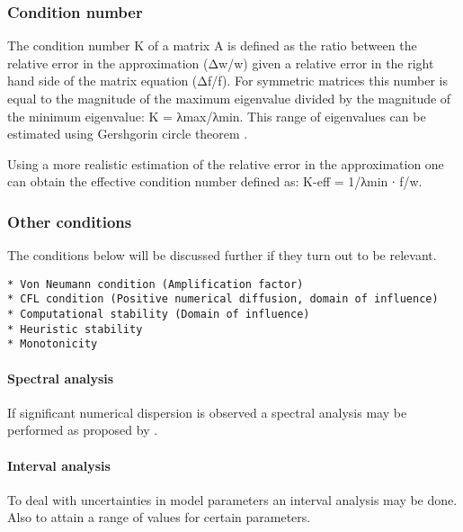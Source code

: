 \citep{Vuik2007}

\subsubsection{Condition number}\label{condition-number}

The condition number Κ of a matrix A is defined as the ratio between the
relative error in the approximation (Δw/w) given a relative error in the
right hand side of the matrix equation (Δf/f). For symmetric matrices
this number is equal to the magnitude of the maximum eigenvalue divided
by the magnitude of the minimum eigenvalue: Κ =
\textbar{}λmax\textbar{}/\textbar{}λmin\textbar{}. This range of
eigenvalues can be estimated using Gershgorin circle theorem
\citep[p.107]{Vuik2007}.

Using a more realistic estimation of the relative error in the
approximation one can obtain the effective condition number defined as:
Κ-eff = 1/λmin ∙ \textbar{}f\textbar{}/\textbar{}w\textbar{}.

\subsubsection{Other conditions}\label{other-conditions}

The conditions below will be discussed further if they turn out to be
relevant.

\begin{verbatim}
* Von Neumann condition (Amplification factor)
* CFL condition (Positive numerical diffusion, domain of influence)
* Computational stability (Domain of influence)
* Heuristic stability 
* Monotonicity
\end{verbatim}

\citep{zijlema_computational_2015}

\paragraph{Spectral analysis}\label{spectral-analysis}

If significant numerical dispersion is observed a spectral analysis may
be performed as proposed by \citet{Ruano2019}.

\paragraph{Interval analysis}\label{interval-analysis}

To deal with uncertainties in model parameters an interval analysis may
be done. Also to attain a range of values for certain parameters.

